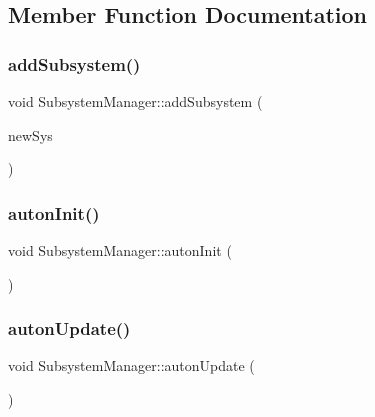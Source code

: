\subsection{Member Function Documentation}
\mbox{\label{classSubsystemManager_ae3910a93d2d417e07013d4b396d3a78b}} 
\subsubsection{\texorpdfstring{add\+Subsystem()}{addSubsystem()}}
{\footnotesize\ttfamily void Subsystem\+Manager\+::add\+Subsystem (\begin{DoxyParamCaption}\item[{const std\+::shared\+\_\+ptr$<$ \hyperlink{classFluxSubsystem}{Flux\+Subsystem} $>$ \&}]{new\+Sys }\end{DoxyParamCaption})}

\mbox{\label{classSubsystemManager_a41232e2fb8956d8321522a23a1f63491}} 
\subsubsection{\texorpdfstring{auton\+Init()}{autonInit()}}
{\footnotesize\ttfamily void Subsystem\+Manager\+::auton\+Init (\begin{DoxyParamCaption}{ }\end{DoxyParamCaption})}

\mbox{\label{classSubsystemManager_aa5bfa5743a4b8fdb8a6d83208b2f95dd}} 
\subsubsection{\texorpdfstring{auton\+Update()}{autonUpdate()}}
{\footnotesize\ttfamily void Subsystem\+Manager\+::auton\+Update (\begin{DoxyParamCaption}{ }\end{DoxyParamCaption})}


